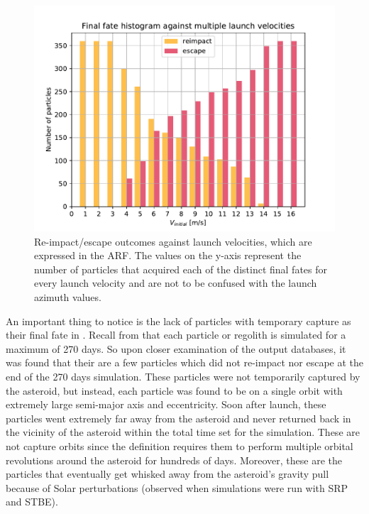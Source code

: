 \begin{figure}[htb]
\centering
\captionsetup{justification=centering}
\includegraphics[width=\textwidth, height=0.4\textheight, keepaspectratio=true]{Images/longest_edge_no_perturbations/final_fate_histogram_all_velocities.pdf}
\caption{Re-impact/escape outcomes against launch velocities, which are expressed in the \gls{ARF}. The values on the y-axis represent the number of particles that acquired each of the distinct final fates for every launch velocity and are not to be confused with the launch azimuth values.}
\label{fig:final_fate_hist_noSP}
\end{figure}
\FloatBarrier
An important thing to notice is the lack of particles with temporary capture as their final fate in . Recall from  that each particle or regolith is simulated for a maximum of 270 days. So upon closer examination of the output databases, it was found that their are a few particles which did not re-impact nor escape at the end of the 270 days simulation. These particles were not temporarily captured by the asteroid, but instead, each particle was found to be on a single orbit with extremely large semi-major axis and eccentricity. Soon after launch, these particles went extremely far away from the asteroid and never returned back in the vicinity of the asteroid within the total time set for the simulation. These are not capture orbits since the definition requires them to perform multiple orbital revolutions around the asteroid for hundreds of days. Moreover, these are the particles that eventually get whisked away from the asteroid's gravity pull because of Solar perturbations (observed when simulations were run with \gls{SRP} and \gls{STBE}).
